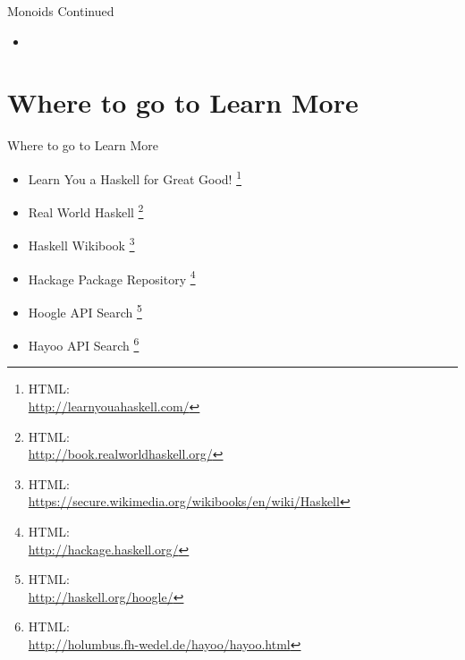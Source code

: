 \documentclass{beamer}                  %
\newcommand{\srule}{
	\rule{\textwidth}{1pt}\\
}
\newlength{\subsecwidth}
\newenvironment{slide}{
	\begin{frame} %
	\settowidth{\subsecwidth}{\insertsubsection} %
	\ifthenelse{\dimtest{\subsecwidth}{<}{1pt}}{ %
		\frametitle{\insertsection\\             %
		\vspace{-1ex}                            %
		\color{fore}\srule                       %
		\par                                     %
		\vspace{-3ex}                            %
		}
	}{                                           %
		\frametitle{\insertsection\ -- \insertsubsection\\ %
		\vspace{-1ex}                            %
		\color{fore}\srule                       %
		\par                                     %
		\vspace{-3ex}                            %
		}
	}
	\Large                                       %
}{
	\end{frame}
}
\newcommand{\titleslide}[1]{
	\section{#1}             %
	\begin{slide}
		\begin{center}
			\color{comments}
			\Huge            %
			#1               %
		\end{center}
	\end{slide}
}
\renewcommand{\thefootnote}{\fnsymbol{footnote}} %
\begin{document}

\begin{slide}
  Monoids Continued
  \begin{itemize}
    \item
      \code
  \end{itemize}
\end{slide}





\renewcommand{\thefootnote}{\arabic{footnote}} %
\setcounter{footnote}{0}                       %
\titleslide{Where to go to Learn More}
\begin{slide}
  \begin{itemize}
    \normalsize

  \item Learn You a Haskell for Great Good!
    \footnote{
      HTML:\\ \url{http://learnyouahaskell.com/}
    }

  \item Real World Haskell
    \footnote{
      HTML:\\ \url{http://book.realworldhaskell.org/}
    }

  \item Haskell Wikibook
    \footnote{
      HTML:\\ \url{https://secure.wikimedia.org/wikibooks/en/wiki/Haskell}
    }

  \item Hackage Package Repository
    \footnote{
      HTML:\\ \url{http://hackage.haskell.org/}
    }

  \item Hoogle API Search
    \footnote{
      HTML:\\ \url{http://haskell.org/hoogle/}
    }

  \item Hayoo API Search
    \footnote{
      HTML:\\ \url{http://holumbus.fh-wedel.de/hayoo/hayoo.html}
    }

  \end{itemize}
\end{slide}
\end{document}
